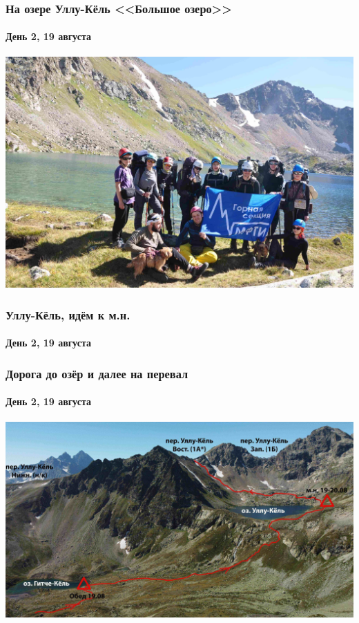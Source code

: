 \begin{frame}
	\frametitle{На озере Уллу-Кёль <<Большое озеро>>}
	\framesubtitle{День 2, 19 августа}
	\centering
	\includegraphics[width=\linewidth]{../pics/DSC_0800}
\end{frame}

\begin{frame}
	\frametitle{Уллу-Кёль, идём к м.н.}
	\framesubtitle{День 2, 19 августа}
	\centering
\end{frame}


\begin{frame}
	\frametitle{Дорога до озёр и далее на перевал}
	\framesubtitle{День 2, 19 августа}
	\centering
	\includegraphics[width=\linewidth]{../pics/ullu_kuel_route}
\end{frame}